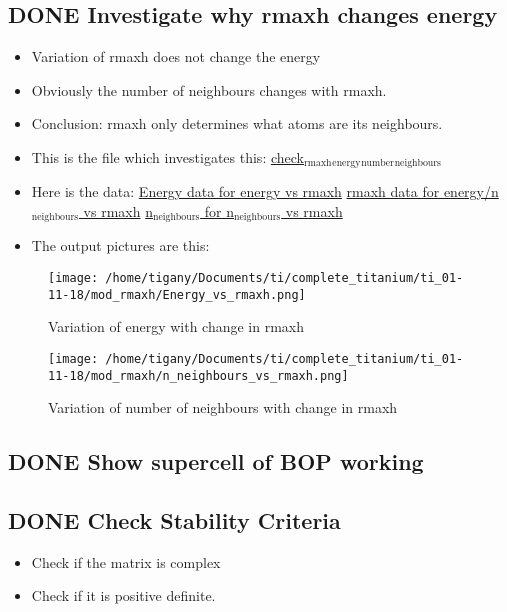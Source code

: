 \documentclass[11pt]{article}
\begin{document}
\subsection{{\bfseries\sffamily DONE} Investigate why rmaxh changes energy}
\label{sec-1-8}
\begin{itemize}
\item Variation of rmaxh does not change the energy
\item Obviously the number of neighbours changes with rmaxh.
\item Conclusion: rmaxh only determines what atoms are its neighbours.
\item This is the file which investigates this:
\href{file:///home/tigany/Documents/ti/complete_titanium/ti_01-11-18/mod_rmaxh/check_rmaxh_energy_neighbours.py}{check$_{\text{rmaxh}}$$_{\text{energy}}$$_{\text{number}}$$_{\text{neighbours}}$}
\item Here is the data:
\href{file:///home/tigany/Documents/ti/complete_titanium/ti_01-11-18/mod_rmaxh/energy_for_energy_vs_rmaxh.pkl}{Energy data for energy vs rmaxh}
\href{file:///home/tigany/Documents/ti/complete_titanium/ti_01-11-18/mod_rmaxh/rmaxh_for_energy_or_n_neighbours_vs_rmaxh.pkl}{rmaxh data for energy/n$_{\text{neighbours}}$ vs rmaxh}
\href{file:///home/tigany/Documents/ti/complete_titanium/ti_01-11-18/mod_rmaxh/n_neighbours_for_n_neighbours_vs_rmaxh.pkl}{n$_{\text{neighbours}}$ for n$_{\text{neighbours}}$ vs rmaxh}
\item The output pictures are this:
\end{itemize}
\begin{figure}[htb]
\centering
\texttt{[image: /home/tigany/Documents/ti/complete\_titanium/ti\_01-11-18/mod\_rmaxh/Energy\_vs\_rmaxh.png]}
\caption{\label{fig:Energy_vs_rmaxh.png}Variation of energy with change in rmaxh}
\end{figure}
\begin{figure}[htb]
\centering
\texttt{[image: /home/tigany/Documents/ti/complete\_titanium/ti\_01-11-18/mod\_rmaxh/n\_neighbours\_vs\_rmaxh.png]}
\caption{\label{fig:n_neighbours_vs_rmaxh.png}Variation of number of neighbours with change in rmaxh}
\end{figure}

\subsection{{\bfseries\sffamily DONE} Show supercell of BOP working}
\label{sec-1-9}
\subsection{{\bfseries\sffamily DONE} Check Stability Criteria}
\label{sec-1-10}
\begin{itemize}
\item Check if the matrix is complex
\item Check if it is positive definite.
\end{itemize}
\end{document}
